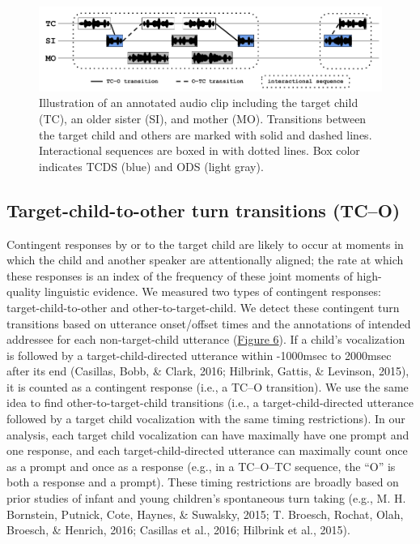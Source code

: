 \documentclass[floatsintext,man]{apa6}
\theoremstyle{definition}
\theoremstyle{definition}
\theoremstyle{definition}
\theoremstyle{remark}
\begin{document}
\begin{figure}

{\centering \includegraphics[width=1\linewidth]{Tseltal-CLE_files/TseltalCLE-TurnTimingIllustration} 

}

\caption{Illustration of an annotated audio clip including the target child (TC), an older sister (SI), and mother (MO). Transitions between the target child and others are marked with solid and dashed lines. Interactional sequences are boxed in with dotted lines. Box color indicates TCDS (blue) and ODS (light gray).}\label{fig:fig6}
\end{figure}

\subsection{Target-child-to-other turn transitions
(TC--O)}\label{target-child-to-other-turn-transitions-tco}

Contingent responses by or to the target child are likely to occur at
moments in which the child and another speaker are attentionally
aligned; the rate at which these responses is an index of the frequency
of these joint moments of high-quality linguistic evidence. We measured
two types of contingent responses: target-child-to-other and
other-to-target-child. We detect these contingent turn transitions based
on utterance onset/offset times and the annotations of intended
addressee for each non-target-child utterance
(\protect\hyperlink{fig6}{Figure 6}). If a child's vocalization is
followed by a target-child-directed utterance within -1000msec to
2000msec after its end (Casillas, Bobb, \& Clark, 2016; Hilbrink,
Gattis, \& Levinson, 2015), it is counted as a contingent response
(i.e., a TC--O transition). We use the same idea to find
other-to-target-child transitions (i.e., a target-child-directed
utterance followed by a target child vocalization with the same timing
restrictions). In our analysis, each target child vocalization can have
maximally have one prompt and one response, and each
target-child-directed utterance can maximally count once as a prompt and
once as a response (e.g., in a TC--O--TC sequence, the \enquote{O} is
both a response and a prompt). These timing restrictions are broadly
based on prior studies of infant and young children's spontaneous turn
taking (e.g., M. H. Bornstein, Putnick, Cote, Haynes, \& Suwalsky, 2015;
T. Broesch, Rochat, Olah, Broesch, \& Henrich, 2016; Casillas et al.,
2016; Hilbrink et al., 2015).
\end{document}

